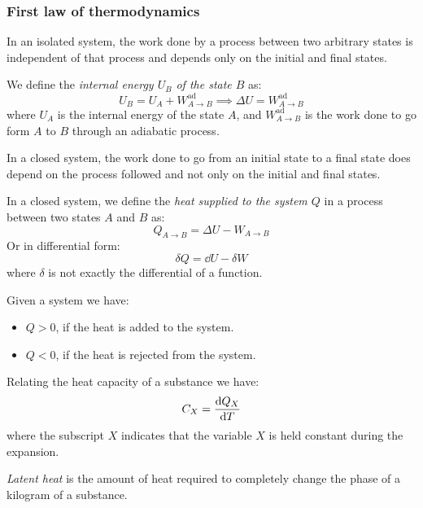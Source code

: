 \documentclass[../../../main.tex]{subfiles}
\begin{document}
\begin{multicols}{2}
  \subsubsection{First law of thermodynamics}
  \begin{law}
    In an isolated system, the work done by a process between two arbitrary states is independent of that process and depends only on the initial and final states.
  \end{law}
  \begin{corollary}
    We define the \textit{internal energy $U_B$ of the state $B$} as:
    $$U_B=U_A+W_{A\to B}^\text{ad}\implies \Delta U=W_{A\to B}^\text{ad}$$
    where $U_A$ is the internal energy of the state $A$, and $W_{A\to B}^\text{ad}$ is the work done to go form $A$ to $B$ through an adiabatic process.
  \end{corollary}
  \begin{law}
    In a closed system, the work done to go from an initial state to a final state does depend on the process followed and not only on the initial and final states.
  \end{law}
  \begin{corollary}
    In a closed system, we define the \textit{heat supplied to the system $Q$} in a process between two states $A$ and $B$ as:
    $$Q_{A\to B}=\Delta U-W_{A\to B}$$
    Or in differential form:
    $$\delta Q=\dd U-\delta W$$
    where $\delta$ is not exactly the differential of a function.
  \end{corollary}
  \begin{lemma}
    Given a system we have:
    \begin{itemize}
      \item $Q>0$, if the heat is added to the system.
      \item $Q<0$, if the heat is rejected from the system.
    \end{itemize}
  \end{lemma}
  \begin{definition}
    Relating the heat capacity of a substance we have: $$C_X=\dv{Q_X}{T}$$
    where the subscript $X$ indicates that the variable $X$ is held constant during the expansion.
  \end{definition}
  \begin{definition}
    \textit{Latent heat} is the amount of heat required to completely change the phase of a kilogram of a substance.

\end{definition}
\end{multicols}
\end{document}
